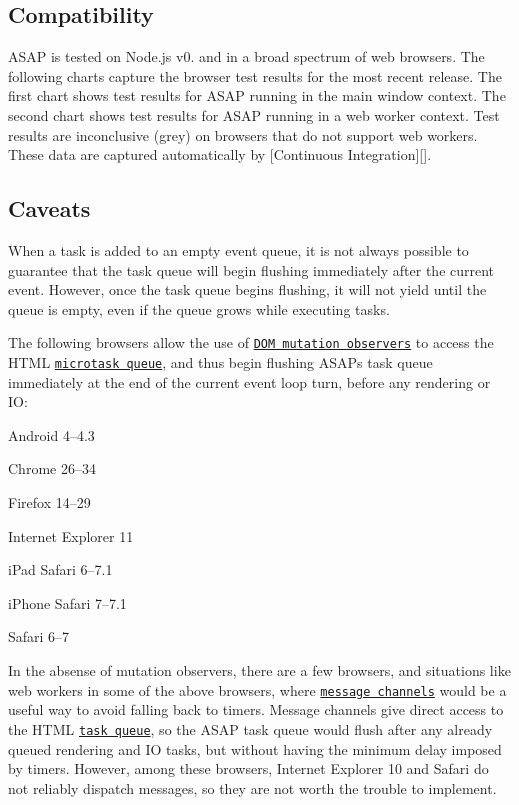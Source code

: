 \subsection*{Compatibility}

A\+S\+AP is tested on Node.\+js v0. and in a broad spectrum of web browsers. The following charts capture the browser test results for the most recent release. The first chart shows test results for A\+S\+AP running in the main window context. The second chart shows test results for A\+S\+AP running in a web worker context. Test results are inconclusive (grey) on browsers that do not support web workers. These data are captured automatically by \mbox{[}Continuous Integration\mbox{]}\mbox{[}\mbox{]}.





\subsection*{Caveats}

When a task is added to an empty event queue, it is not always possible to guarantee that the task queue will begin flushing immediately after the current event. However, once the task queue begins flushing, it will not yield until the queue is empty, even if the queue grows while executing tasks.

The following browsers allow the use of \href{http://dom.spec.whatwg.org/#mutation-observers}{\tt D\+OM mutation observers} to access the H\+T\+ML \href{http://www.whatwg.org/specs/web-apps/current-work/multipage/webappapis.html#microtask-queue}{\tt microtask queue}, and thus begin flushing A\+S\+AP\textquotesingle{}s task queue immediately at the end of the current event loop turn, before any rendering or IO\+:


\begin{DoxyItemize}
\item Android 4–4.3
\item Chrome 26–34
\item Firefox 14–29
\item Internet Explorer 11
\item i\+Pad Safari 6–7.1
\item i\+Phone Safari 7–7.1
\item Safari 6–7
\end{DoxyItemize}

In the absense of mutation observers, there are a few browsers, and situations like web workers in some of the above browsers, where \href{http://www.whatwg.org/specs/web-apps/current-work/multipage/web-messaging.html#message-channels}{\tt message channels} would be a useful way to avoid falling back to timers. Message channels give direct access to the H\+T\+ML \href{http://www.whatwg.org/specs/web-apps/current-work/multipage/webappapis.html#concept-task}{\tt task queue}, so the A\+S\+AP task queue would flush after any already queued rendering and IO tasks, but without having the minimum delay imposed by timers. However, among these browsers, Internet Explorer 10 and Safari do not reliably dispatch messages, so they are not worth the trouble to implement.


